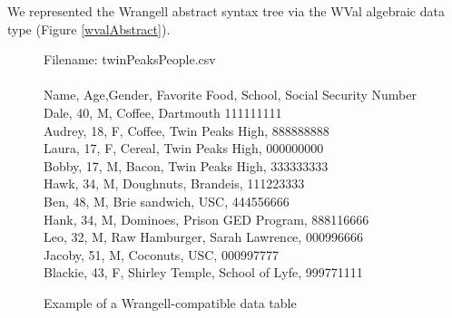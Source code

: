 \documentclass[preprint,nocopyrightspace]{sig-alternate}
\begin{document}
\begin{comment}
TODO: add stuff about doing transformations on data
\end{comment}

We represented the Wrangell abstract syntax tree via the WVal algebraic data type (Figure \ref{wvalAbstract}).



\onecolumn

\begin{figure}
\caption{Example of a Wrangell-compatible data table}
Filename: twinPeaksPeople.csv
\\\\
Name,   Age,Gender,	Favorite Food,	School,				Social Security Number \\
Dale,   40,	M,		Coffee,			Dartmouth			111111111\\
Audrey, 18,	F,		Coffee,			Twin Peaks High,	888888888\\
Laura,  17,	F,		Cereal,			Twin Peaks High,	000000000\\
Bobby,  17,	M,		Bacon,			Twin Peaks High,	333333333\\
Hawk,   34,	M,		Doughnuts,		Brandeis,			111223333\\
Ben,    48,	M,		Brie sandwich,	USC,				444556666\\
Hank,   34,	M,		Dominoes,		Prison GED Program,	888116666\\
Leo,    32,	M,		Raw Hamburger,	Sarah Lawrence,		000996666\\
Jacoby,  51, M,		Coconuts,		USC,				000997777\\
Blackie,	43, F,	Shirley Temple,	School of Lyfe,		999771111\\	
\label{exampleTable}	
\end{figure} 
\end{document}
